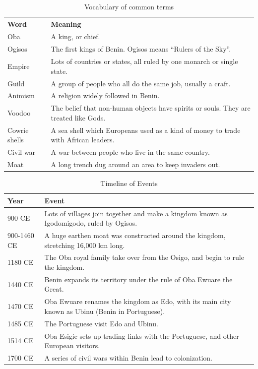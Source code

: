 \begin{table}[htb]
\centering
\caption{Vocabulary of common terms\protect\footnotemark}
\label{tab:vocabulary}
\begin{tabularx}{\linewidth}{|l|X|}
\hline
\textbf{Word} & \textbf{Meaning} \\
\hline
Oba & A king, or chief. \\
\hline
Ogisos & The first kings of Benin. Ogisos means “Rulers of the Sky”. \\
\hline
Empire & Lots of countries or states, all ruled by one monarch or single state. \\
\hline
Guild & A group of people who all do the same job, usually a craft. \\
\hline
Animism & A religion widely followed in Benin. \\
\hline
Voodoo & The belief that non-human objects have spirits or souls. They are treated like Gods. \\
\hline
Cowrie shells & A sea shell which Europeans used as a kind of money to trade with African leaders. \\
\hline
Civil war & A war between people who live in the same country. \\
\hline
Moat & A long trench dug around an area to keep invaders out. \\
\hline
\end{tabularx}
\end{table}

\begin{table}[htb]
\centering
\caption{Timeline of Events\protect\footnotemark}
\label{tab:timeline}
\begin{tabularx}{\linewidth}{|l|X|}
\hline
\textbf{Year} & \textbf{Event} \\
\hline
900 CE & Lots of villages join together and make a kingdom known as Igodomigodo, ruled by Ogisos. \\
\hline
900-1460 CE & A huge earthen moat was constructed around the kingdom, stretching 16,000 km long. \\
\hline
1180 CE & The Oba royal family take over from the Osigo, and begin to rule the kingdom. \\
\hline
1440 CE & Benin expands its territory under the rule of Oba Ewuare the Great. \\
\hline
1470 CE & Oba Ewuare renames the kingdom as Edo, with its main city known as Ubinu (Benin in Portuguese). \\
\hline
1485 CE & The Portuguese visit Edo and Ubinu. \\
\hline
1514 CE & Oba Esigie sets up trading links with the Portuguese, and other European visitors. \\
\hline
1700 CE & A series of civil wars within Benin lead to colonization. \\
\hline
\end{tabularx}
\end{table}

